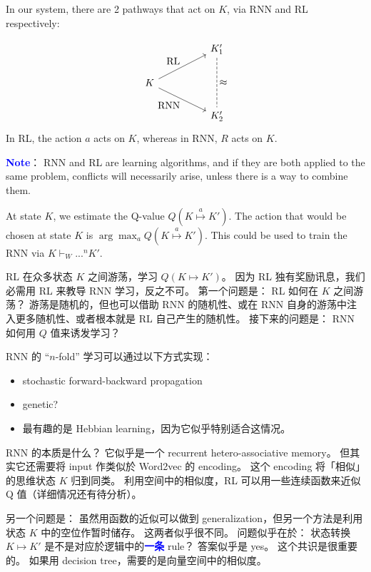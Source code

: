 \documentclass[orivec]{llncs}
\newcommand{\emp}[1]{\textbf{\textcolor{blue}{#1}}}
\begin{document}
In our system, there are 2 pathways that act on $K$, via RNN and RL respectively: \par
\begin{equation}
\begin{tikzcd}[column sep=huge]
& K'_1 \arrow[dd, dashed, no head, "\scalebox{1.3}{$\approx$}"] \\
K \arrow[ur, "\mbox{RL}"] \arrow[dr, "\mbox{RNN}"'] & \\
& K'_2
\end{tikzcd}
\end{equation}
In RL, the action $a$ acts on $K$, whereas in RNN, $R$ acts on $K$.

\emp{Note}： RNN and RL are learning algorithms, and if they are both applied to the same problem, conflicts will necessarily arise, unless there is a way to combine them.

At state $K$, we estimate the Q-value $Q(K \stackrel{a}{\mapsto} K')$.  The action that would be chosen at state $K$ is $\displaystyle \arg\max_a Q(K \stackrel{a}{\mapsto} K')$.  This could be used to train the RNN via $\displaystyle K \vdash_W ...^n K'$.

RL 在众多状态 $K$ 之间游荡，学习 $Q(K \mapsto K')$。  因为 RL 独有奖励讯息，我们必需用 RL 来教导 RNN 学习，反之不可。  第一个问题是： RL 如何在 $K$ 之间游荡？   游荡是随机的，但也可以借助 RNN 的随机性、或在 RNN 自身的游荡中注入更多随机性、或者根本就是 RL 自己产生的随机性。  接下来的问题是： RNN 如何用 $Q$ 值来诱发学习？

RNN 的 ``$n$-fold'' 学习可以通过以下方式实现： 
\begin{itemize}
\item stochastic forward-backward propagation
\item genetic?
\item 最有趣的是 Hebbian learning，因为它似乎特别适合这情况。  
\end{itemize}

RNN 的本质是什么？  它似乎是一个 recurrent hetero-associative memory。  但其实它还需要将 input 作类似於 Word2vec 的 encoding。  这个 encoding 将「相似」的思维状态 $K$ 归到同类。  利用空间中的相似度，RL 可以用一些连续函数来近似 Q 值（详细情况还有待分析）。

另一个问题是： 虽然用函数的近似可以做到 generalization，但另一个方法是利用状态 $K$ 中的空位作暂时储存。 这两者似乎很不同。  问题似乎在於： 状态转换 $K \mapsto K'$ 是不是对应於逻辑中的\emp{一条} rule？  答案似乎是 yes。  这个共识是很重要的。  如果用 decision tree，需要的是向量空间中的相似度。
\end{document}
